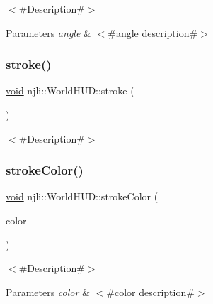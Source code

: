 $<$\#\+Description\#$>$


\begin{DoxyParams}{Parameters}
{\em angle} & $<$\#angle description\#$>$ \\
\hline
\end{DoxyParams}
\mbox{\label{classnjli_1_1_world_h_u_d_ae4774f72db77fef1dbf4c6b7adc2e357}} 
\subsubsection{\texorpdfstring{stroke()}{stroke()}}
{\footnotesize\ttfamily \mbox{\hyperlink{_thread_8h_af1e856da2e658414cb2456cb6f7ebc66}{void}} njli\+::\+World\+H\+U\+D\+::stroke (\begin{DoxyParamCaption}{ }\end{DoxyParamCaption})}

$<$\#\+Description\#$>$ \mbox{\label{classnjli_1_1_world_h_u_d_aec50b89dcd5f2d5d43248e67419e7665}} 
\subsubsection{\texorpdfstring{stroke\+Color()}{strokeColor()}}
{\footnotesize\ttfamily \mbox{\hyperlink{_thread_8h_af1e856da2e658414cb2456cb6f7ebc66}{void}} njli\+::\+World\+H\+U\+D\+::stroke\+Color (\begin{DoxyParamCaption}\item[{const bt\+Vector4 \&}]{color }\end{DoxyParamCaption})}

$<$\#\+Description\#$>$


\begin{DoxyParams}{Parameters}
{\em color} & $<$\#color description\#$>$ \\
\hline
\end{DoxyParams}
\mbox{\label{classnjli_1_1_world_h_u_d_aa348c8907633ae02aff28a856f75cb45}} 
